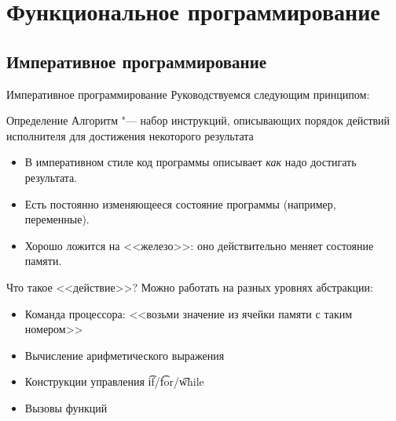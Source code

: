 \section{Функциональное программирование}
\subsection{Императивное программирование}

\begin{frame}
\end{frame}

\begin{frame}{Императивное программирование}
	Руководствуемся следующим принципом:
	\begin{exampleblock}{Определение}
		Алгоритм "--- набор инструкций, описывающих порядок действий исполнителя для достижения некоторого результата
	\end{exampleblock}
	\begin{itemize}
		\item В императивном стиле код программы описывает \textit{как} надо достигать результата.
		\item Есть постоянно изменяющееся состояние программы (например, переменные).
		\item Хорошо ложится на <<железо>>: оно действительно меняет состояние памяти.
	\end{itemize}
\end{frame}

\begin{frame}{Что такое <<действие>>?}
    Можно работать на разных уровнях абстракции:
	\begin{itemize}
		\item Команда процессора: <<возьми значение из ячейки памяти с таким номером>>
		\item Вычисление арифметического выражения
		\item Конструкции управления \t{if}/\t{for}/\t{while}
		\item Вызовы функций
	\end{itemize}
\end{frame}

